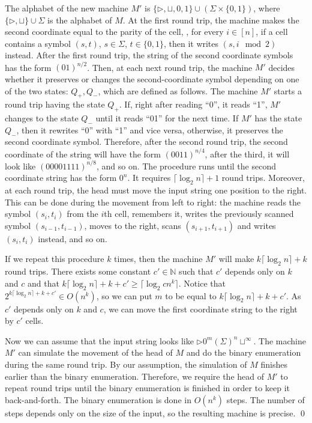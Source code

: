 \documentclass{lmcs}
\begin{document}
The alphabet of the new machine $M'$ is $\{\triangleright,\sqcup,0,1\}\cup(\Sigma\times\{0,1\})$, where $\{\triangleright,\sqcup\}\cup\Sigma$ is the alphabet of $M$. 
At the first round trip, the machine makes the second coordinate equal to the parity of the cell, \ie, for every $i\in[n]$, if a cell contains a symbol $(s,t)$, $s\in\Sigma$, $t\in\{0,1\}$, then it writes $(s,i \mod 2)$ instead. 
After the first round trip, the string of the second coordinate symbols has the form $(01)^{n/2}$. 
Then, at each next round trip, the machine $M'$ decides whether it preserves or changes the second-coordinate symbol depending on one of the two states: $Q_+, Q_-$, which are defined as follows.
The machine $M'$ starts a round trip having the state $Q_+$.
If, right after reading ``0'', it reads ``1'', $M'$ changes to the state $Q_-$ until it reads ``01'' for the next time.
If $M'$ has the state $Q_-$, then it rewrites ``0'' with ``1'' and vice versa, otherwise, it preserves the second coordinate symbol.
Therefore, after the second round trip, the second coordinate of the string will have the form $(0011)^{n/4}$, after the third, it will look like $(00001111)^{n/8}$, and so on. 
The procedure runs until the second coordinate string has the form $0^n$. 
It requires $\lceil\log_2 n\rceil + 1$ round trips. 
Moreover, at each round trip, the head must move the input string one position to the right. 
This can be done during the movement from left to right: the machine reads the symbol $(s_i,t_i)$ from the $i$th cell, remembers it, writes the previously scanned symbol $(s_{i-1},t_{i-1})$, moves to the right, scans $(s_{i+1},t_{i+1})$ and writes $(s_i,t_i)$ instead, and so on.

If we repeat this procedure $k$ times, then the machine $M'$ will make $k\lceil\log_2 n\rceil + k$ round trips.
There exists some constant $c'\in\mathbb{N}$  such that $c'$ depends only on $k$ and $c$ and that $k\lceil\log_2 n\rceil + k +c' \geq \lceil\log_2 cn^k\rceil$.
Notice that $2^{k\lceil\log_2 n\rceil + k +c'}\in O(n^k)$, so we can put $m$ to be equal to $k\lceil\log_2 n\rceil + k +c'$.
As $c'$ depends only on $k$ and $c$, we can move the first coordinate string to the right by $c'$ cells.

Now we can assume that the input string looks like $\triangleright0^{m}(\Sigma)^n\sqcup^\infty$. The machine $M'$ can simulate the movement of the head of $M$ and do the binary enumeration during the same round trip. By our assumption, the simulation of $M$ finishes earlier than the binary enumeration. Therefore, we require the head of $M'$ to repeat round trips until the binary enumeration is finished in order to keep it back-and-forth. The binary enumeration is done in $O(n^k)$ steps. The number of steps depends only on the size of the input, so the resulting machine is precise.
\qed
\end{document}
